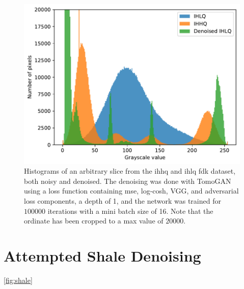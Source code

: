 \begin{figure}[htbp]
  \centering
  \includegraphics[width=.85\textwidth]{figures/kimroberthist.pdf}
  \caption[Histograms of IHHQ and IHLQ, noisy and denoised]{Histograms of an arbitrary slice from the \gls{ihhq} and \gls{ihlq} \gls{fdk} dataset, both noisy and denoised. The denoising was done with TomoGAN using a loss function containing \gls{mse}, log-cosh, VGG, and adversarial loss components, a depth of 1, and the network was trained for $100 000$ iterations with a mini batch size of 16. Note that the ordinate has been cropped to a max value of $20000$. }
  \label{fig:kimroberthist}
\end{figure}

\section{Attempted Shale Denoising}
\cref{fig:shale}

